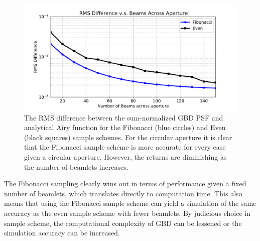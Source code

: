 \begin{figure}[H]
    \centering
    \includegraphics[width=\textwidth]{rms_vs_nbeamlets.pdf}
    \caption{The RMS difference between the sum-normalized GBD PSF and analytical Airy function for the Fibonacci (blue circles) and Even (black squares) sample schemes. For the circular aperture it is clear that the Fibonacci sample scheme is more accurate for every case given a circular aperture. However, the returns are diminishing as the number of beamlets increases.} 
    \label{fig:rms_vs_sample_airy}
\end{figure}

The Fibonacci sampling clearly wins out in terms of performance given a fixed number of beamlets, which translates directly to computation time. This also means that using the Fibonacci sample scheme can yield a simulation of the same accuracy as the even sample scheme with fewer beamlets. By judicious choice in sample scheme, the computational complexity of GBD can be lessened or the simulation accuracy can be increased.


